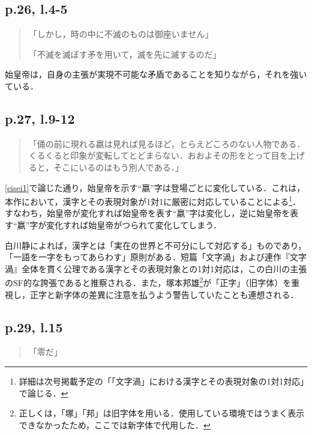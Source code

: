 \documentclass[10pt, a5paper, twoside]{jsarticle}
\theoremstyle{definition}
\begin{document}
		\subsection{p.26, l.4-5}

		\begin{quote}

			「しかし，時の中に不滅のものは御座いません」
		
			「不滅を滅ぼす矛を用いて，滅を先に滅するのだ」

		\end{quote}

		始皇帝は，自身の主張が実現不可能な矛盾であることを知りながら，それを強いている．

		\subsection{p.27, l.9-12}

		\begin{quote}

			「俑の前に現れる嬴は見れば見るほど，とらえどころのない人物である．くるくると印象が変転してとどまらない．おおよその形をとって目を上げると，そこにいるのはもう別人である．」

		\end{quote}

		\ref{eisei1}で論じた通り，始皇帝を示す“嬴”字は登場ごとに変化している．これは，本作において，漢字とその表現対象が1対1に厳密に対応していることによる\footnote{詳細は次号掲載予定の「「文字渦」における漢字とその表現対象の1対1対応」で論じる．}．すなわち，始皇帝が変化すれば始皇帝を表す“嬴”字は変化し，逆に始皇帝を表す“嬴”字が変化すれば始皇帝がつられて変化してしまう．

		白川静によれば，漢字とは「実在の世界と不可分にして対応する」ものであり，「一語を一字をもってあらわす」原則がある\cite{kanji}．短篇「文字渦」および連作『文字渦』全体を貫く公理である漢字とその表現対象との1対1対応は，この白川の主張のSF的な誇張であると推察される．また，塚本邦雄\footnote{正しくは，「塚」「邦」は旧字体を用いる．使用している環境ではうまく表示できなかったため，ここでは新字体で代用した．}が「正字」（旧字体）を重視し，正字と新字体の差異に注意を払うよう警告していた\cite{tsuka}ことも連想される．

		\subsection{p.29, l.15}

		\begin{quote}
			
			「零だ」
		
		\end{quote}
\end{document}
